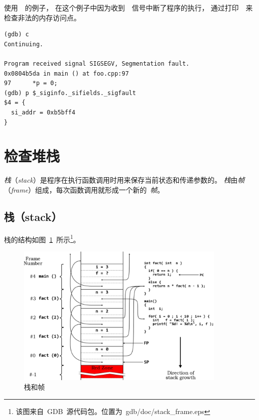 使用~~的例子，
在这个例子中因为收到~~信号中断了程序的执行，
通过打印~~来检查非法的内存访问点。
\begin{lstlisting}
(gdb) c
Continuing.

Program received signal SIGSEGV, Segmentation fault.
0x0804b5da in main () at foo.cpp:97
97	    *p = 0;
(gdb) p $_siginfo._sifields._sigfault
$4 = {
  si_addr = 0xb5bff4
}
\end{lstlisting}

\section{检查堆栈}
 
 

\emph{栈}（\emph{stack}）是程序在执行函数调用时用来保存当前状态和传递参数的。
\emph{栈}由\emph{帧}（\emph{frame}）组成，每次函数调用就形成一个新的~\emph{帧}。

\subsection{栈（stack）}
栈的结构如图~\ref{fig:stack_frame}~所示\footnote{该图来自~GDB~源代码包。位置为~gdb/doc/stack\_frame.eps}。

\begin{figure}
\begin{center}
\includegraphics[width=0.9\textwidth]{figure/stack_frame}
\caption{栈和帧} \label{fig:stack_frame}
\end{center}
\end{figure}

